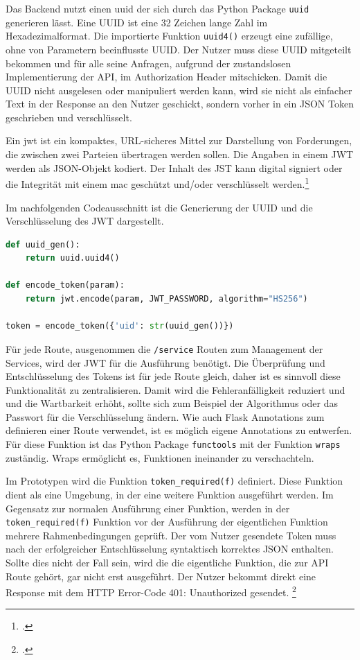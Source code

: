 Das Backend nutzt einen \ac{uuid} der sich durch das Python Package \texttt{uuid} generieren lässt. Eine UUID ist eine 32 Zeichen lange Zahl im Hexadezimalformat. Die importierte Funktion \texttt{uuid4()} erzeugt eine zufällige, ohne von Parametern beeinflusste UUID. Der Nutzer muss diese UUID mitgeteilt bekommen und für alle seine Anfragen, aufgrund der zustandslosen Implementierung der API, im Authorization Header mitschicken. Damit die UUID nicht ausgelesen oder manipuliert werden kann, wird sie nicht als einfacher Text in der Response an den Nutzer geschickt, sondern vorher in ein JSON Token geschrieben und verschlüsselt.

Ein \ac{jwt} ist ein kompaktes, URL-sicheres Mittel zur Darstellung von Forderungen, die zwischen zwei Parteien übertragen werden sollen. Die Angaben in einem JWT werden als JSON-Objekt kodiert. Der Inhalt des JST kann digital signiert oder die Integrität mit einem \ac{mac} geschützt und/oder verschlüsselt werden.\footcite{jones2015json}

Im nachfolgenden Codeausschnitt ist die Generierung der UUID und die Verschlüsselung des JWT dargestellt.
\begin{lstlisting}[language=Python]
def uuid_gen():
    return uuid.uuid4()
    
def encode_token(param):
    return jwt.encode(param, JWT_PASSWORD, algorithm="HS256")

token = encode_token({'uid': str(uuid_gen())})
\end{lstlisting}

Für jede Route, ausgenommen die \texttt{/service} Routen zum Management der Services, wird der JWT für die Ausführung benötigt. Die Überprüfung und Entschlüsselung des Tokens ist für jede Route gleich, daher ist es sinnvoll diese Funktionalität zu zentralisieren. Damit wird die Fehleranfälligkeit reduziert und und die Wartbarkeit erhöht, sollte sich zum Beispiel der Algorithmus oder das Passwort für die Verschlüsselung ändern. Wie auch Flask Annotations zum definieren einer Route verwendet, ist es möglich eigene Annotations zu entwerfen. Für diese Funktion ist das Python Package \texttt{functools} mit der Funktion \texttt{wraps} zuständig. Wraps ermöglicht es, Funktionen ineinander zu verschachteln.

Im Prototypen wird die Funktion \texttt{token\_{}required(f)} definiert. Diese Funktion dient als eine Umgebung, in der eine weitere Funktion ausgeführt werden. Im Gegensatz zur normalen Ausführung einer Funktion, werden in der \texttt{token\_{}required(f)} Funktion vor der Ausführung der eigentlichen Funktion mehrere Rahmenbedingungen geprüft. Der vom Nutzer gesendete Token muss nach der erfolgreicher Entschlüsselung syntaktisch korrektes JSON enthalten. Sollte dies nicht der Fall sein, wird die die eigentliche Funktion, die zur API Route gehört, gar nicht erst ausgeführt. Der Nutzer bekommt direkt eine Response mit dem HTTP Error-Code 401: Unauthorized gesendet. \footcite{fielding1999rfc2616}

